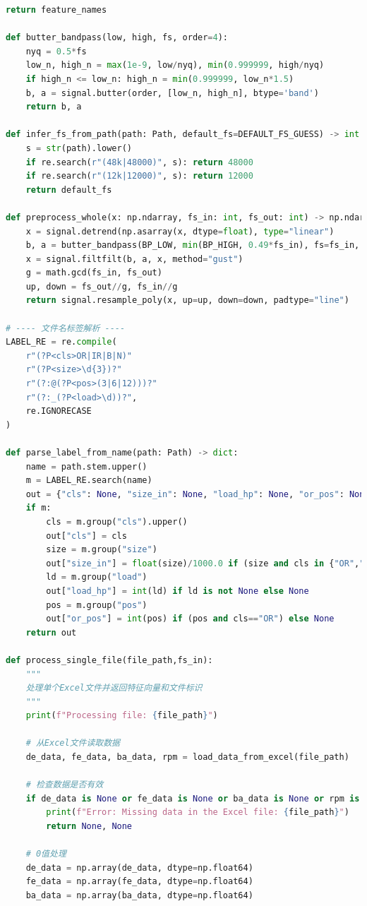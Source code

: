 \documentclass[a4paper]{CPIPC}
\numberwithin{equation}{section}
\begin{document}
\begin{lstlisting}[language=Python, caption=Feature Extraction]
    return feature_names

def butter_bandpass(low, high, fs, order=4):
    nyq = 0.5*fs
    low_n, high_n = max(1e-9, low/nyq), min(0.999999, high/nyq)
    if high_n <= low_n: high_n = min(0.999999, low_n*1.5)
    b, a = signal.butter(order, [low_n, high_n], btype='band')
    return b, a

def infer_fs_from_path(path: Path, default_fs=DEFAULT_FS_GUESS) -> int:
    s = str(path).lower()
    if re.search(r"(48k|48000)", s): return 48000
    if re.search(r"(12k|12000)", s): return 12000
    return default_fs

def preprocess_whole(x: np.ndarray, fs_in: int, fs_out: int) -> np.ndarray:
    x = signal.detrend(np.asarray(x, dtype=float), type="linear")
    b, a = butter_bandpass(BP_LOW, min(BP_HIGH, 0.49*fs_in), fs=fs_in, order=FILTER_ORDER)
    x = signal.filtfilt(b, a, x, method="gust")
    g = math.gcd(fs_in, fs_out)
    up, down = fs_out//g, fs_in//g
    return signal.resample_poly(x, up=up, down=down, padtype="line")

# ---- 文件名标签解析 ----
LABEL_RE = re.compile(
    r"(?P<cls>OR|IR|B|N)"
    r"(?P<size>\d{3})?"
    r"(?:@(?P<pos>(3|6|12)))?"
    r"(?:_(?P<load>\d))?",
    re.IGNORECASE
)

def parse_label_from_name(path: Path) -> dict:
    name = path.stem.upper()
    m = LABEL_RE.search(name)
    out = {"cls": None, "size_in": None, "load_hp": None, "or_pos": None}
    if m:
        cls = m.group("cls").upper()
        out["cls"] = cls
        size = m.group("size")
        out["size_in"] = float(size)/1000.0 if (size and cls in {"OR","IR","B"}) else None
        ld = m.group("load")
        out["load_hp"] = int(ld) if ld is not None else None
        pos = m.group("pos")
        out["or_pos"] = int(pos) if (pos and cls=="OR") else None
    return out

def process_single_file(file_path,fs_in):
    """
    处理单个Excel文件并返回特征向量和文件标识
    """
    print(f"Processing file: {file_path}")
    
    # 从Excel文件读取数据
    de_data, fe_data, ba_data, rpm = load_data_from_excel(file_path)
    
    # 检查数据是否有效
    if de_data is None or fe_data is None or ba_data is None or rpm is None:
        print(f"Error: Missing data in the Excel file: {file_path}")
        return None, None
    
    # 0值处理
    de_data = np.array(de_data, dtype=np.float64)
    fe_data = np.array(fe_data, dtype=np.float64)
    ba_data = np.array(ba_data, dtype=np.float64)
    


\end{lstlisting}
\end{document}
